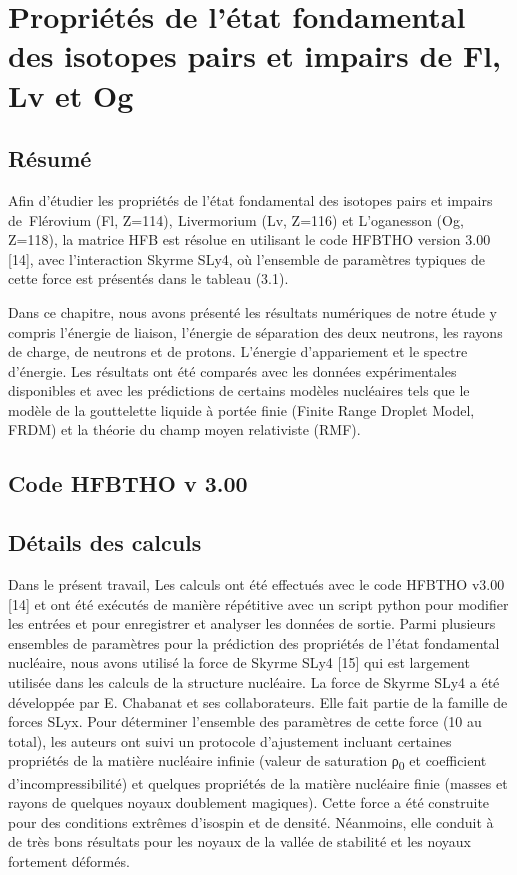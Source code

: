 \chapter{Propriétés de l’état fondamental des isotopes pairs et impairs de Fl, Lv  et Og}


\section{Résumé}

\textbf{ }Afin d'étudier les propriétés de l'état fondamental\textbf{ }des isotopes pairs et impairs  de\textcolor[rgb]{0.1254902,0.12941177,0.13333334}{~Flérovium} (Fl, Z=114),\textbf{\textcolor[rgb]{0.1254902,0.12941177,0.13333334}{ }}\textcolor[rgb]{0.1254902,0.12941177,0.13333334}{Livermorium }(Lv, Z=116) et L’oganesson (Og, Z=118), la matrice HFB est résolue en utilisant le code HFBTHO version 3.00 [14], avec l'interaction Skyrme SLy4, où l’ensemble de paramètres typiques de cette force est présentés dans le tableau (3.1). 

Dans ce chapitre, nous avons présenté les résultats numériques de notre étude y compris l'énergie de liaison, l'énergie de séparation des deux neutrons, les rayons de charge, de neutrons et de protons. L’énergie d’appariement et le spectre d’énergie. Les résultats ont été comparés avec les données expérimentales disponibles et avec les prédictions de certains modèles nucléaires tels que le modèle de la gouttelette liquide à portée finie (Finite Range Droplet Model, FRDM) et la théorie du champ moyen relativiste (RMF).

\section{Code HFBTHO v 3.00} \textbf{ }

\section{Détails des calculs}


 Dans le présent travail, Les calculs ont été effectués avec le code HFBTHO v3.00 [14] et ont été exécutés de manière répétitive avec un script python pour modifier les entrées et pour enregistrer et analyser les données de sortie. Parmi plusieurs ensembles de paramètres pour la prédiction des propriétés de l’état fondamental nucléaire, nous avons utilisé la force de Skyrme SLy4 [15] qui est largement utilisée dans les calculs de la structure nucléaire. La force de Skyrme SLy4 a été développée par E. Chabanat et ses collaborateurs. Elle fait partie de la famille de forces SLyx. Pour déterminer l’ensemble des paramètres de cette force (10 au total), les auteurs ont suivi un protocole d’ajustement incluant certaines propriétés de la matière nucléaire infinie (valeur de saturation ρ\textsubscript{0} et coefficient d’incompressibilité) et quelques propriétés de la matière nucléaire finie (masses et rayons de quelques noyaux doublement magiques). Cette force a été construite pour des conditions extrêmes d’isospin et de densité. Néanmoins, elle conduit à de très bons résultats pour les noyaux de la vallée de stabilité et les noyaux fortement déformés.

